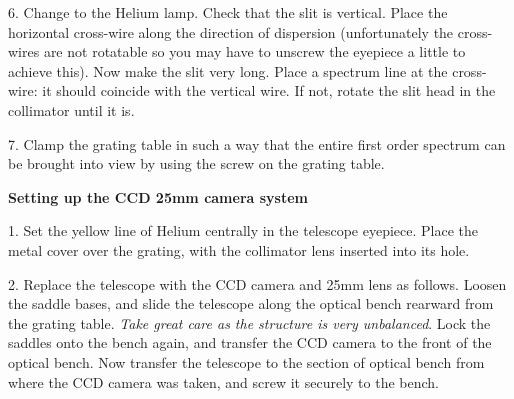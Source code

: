 \documentclass[12pt]{article}
\begin{document}
6. Change to the Helium lamp. Check that the slit is vertical.  
Place the horizontal cross-wire
along the direction of  dispersion (unfortunately the cross-wires are
not rotatable so you may have to  unscrew the eyepiece a little to
achieve this).  Now make the slit very long.  Place a  spectrum line
at the cross-wire: it should coincide with the vertical wire.  If not,
rotate the slit head in the collimator until it is.

7. Clamp the grating table in such a way that the entire first order
spectrum can be  brought into view by using the screw on the grating
table.
\newpage




{\bf Setting up the CCD 25mm camera system}

\begin{center}
\end{center}

1. Set the yellow line of Helium centrally in the telescope eyepiece. 
Place the metal cover over the
grating, with the collimator lens inserted into its hole.

2. Replace the telescope with the CCD camera and 25mm lens as follows. 
Loosen the saddle bases, and slide the telescope along the optical bench rearward from the 
grating table. {\sl Take great care as the structure is very unbalanced\/}. Lock the saddles
onto the bench again, and transfer the CCD camera to the front of the
optical bench. Now transfer the telescope to the section of
optical bench from where the CCD camera was taken, and screw it securely
to the bench.
\end{document}
